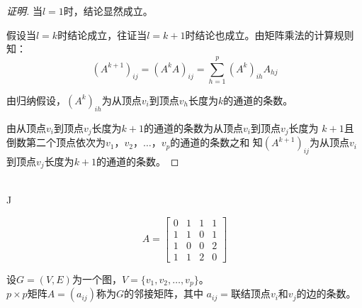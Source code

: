 \documentclass{beamer}
\begin{document}
\begin{CJK*}{UTF8}{gbsn}
\begin{frame}
\begin{proof}[证明]
  当$l=1$时，结论显然成立。

  假设当$l=k$时结论成立，往证当$l=k+1$时结论也成立。由矩阵乘法的计算规则知：
  \[(A^{k+1})_{ij} = (A^{k}A)_{ij} = \sum_{h=1}^p(A^k)_{ih}A_{hj}\]

  由归纳假设，$(A^k)_{ih}$为从顶点$v_i$到顶点$v_h$长度为$k$的通道的条数。

  由从顶点$v_i$到顶点$v_j$长度为$k+1$的通道的条数为从顶点$v_i$到顶点$v_j$长度为
  $k+1$且倒数第二个顶点依次为$v_1$，$v_2$，$\ldots$，$v_p$的通道的条数之和
  知$(A^{k+1})_{ij}$为从顶点$v_i$到顶点$v_j$长度为$k+1$的通道的条数。
  \end{proof}
\end{frame}

\begin{frame}
  \begin{minipage}{0.3\linewidth}
    \centering
    \\
 \vspace*{0.3cm}
 J
\end{minipage}
\begin{minipage}{0.7\linewidth}
\begin{equation*}
  A=\begin{bmatrix}
    0&1&1&1\\
    1&1&0&1\\
    1&0&0&2\\
    1&1&2&0
  \end{bmatrix}
\end{equation*}  
\end{minipage}
    \begin{Def}\justifying\let\raggedright\justifying
  设$G=(V,E)$为一个图，$V=\{v_1,v_2,\ldots,v_p\}$。\\ $p\times p$矩阵$A=(a_{ij})$称为$G$的邻接矩阵，其中
  $a_{ij}=$联结顶点$v_i$和$v_j$的边的条数。
\end{Def}
  

\end{frame}
\end{CJK*}
\end{document}
